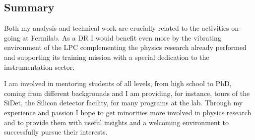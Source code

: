 {\begin{flushleft}
\section{Summary} 
\vspace{\baselineskip}
Both my analysis and technical work are crucially related to the activities on-going at Fermilab. As a DR I would benefit even more by the vibrating environment of the LPC  complementing the physics research already performed and supporting its training mission with a special dedication to the instrumentation sector.

I am involved in mentoring students of all levels, from high school to PhD, coming from different backgrounds and I am providing, for instance, tours of the SiDet,  the Silicon detector facility, for many programs at the lab. Through my experience and passion I hope to get minorities more involved in physics research and to provide them with useful insights and a welcoming environment to successfully pursue their interests.


\end{flushleft}
}
